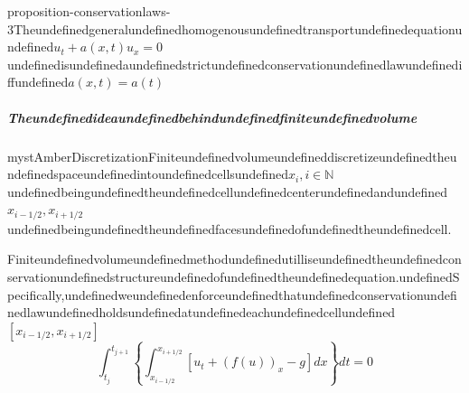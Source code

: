 \begin{mystthmproposition}{}{proposition-conservationlaws-3}Theundefinedgeneralundefinedhomogenousundefinedtransportundefinedequationundefined$u_t+a(x,t)u_x=0$undefinedisundefinedaundefinedstrictundefinedconservationundefinedlawundefinediffundefined$a(x,t)=a(t)$

\end{mystthmproposition}
\subparagraph{Theundefinedideaundefinedbehindundefinedfiniteundefinedvolume}

\begin{mystadmonition}{mystAmber}{Discretization}Finiteundefinedvolumeundefineddiscretizeundefinedtheundefinedspaceundefinedintoundefinedcellsundefined$x_i, i\in \mathbb{N}$undefinedbeingundefinedtheundefinedcellundefinedcenterundefinedandundefined$x_{i -1/2},x_{i+1/2}$undefinedbeingundefinedtheundefinedfacesundefinedofundefinedtheundefinedcell.

\end{mystadmonition}
Finiteundefinedvolumeundefinedmethodundefinedutilliseundefinedtheundefinedconservationundefinedstructureundefinedofundefinedtheundefinedequation.undefinedSpecifically,undefinedweundefinedenforceundefinedthatundefinedconservationundefinedlawundefinedholdsundefinedatundefinedeachundefinedcellundefined$[x_{i -1/2},x_{i+1/2}]$\newline
\begin{equation}
\int_{t_j}^{t_{j+1}}\left\{ \int_{x_{i-1/2}}^{x_{i+1/2}} \left[ u_t + (f(u))_x -g\right]dx \right\}dt=0
\end{equation}